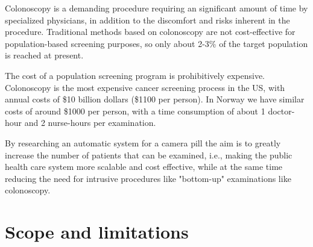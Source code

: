 \documentclass[thesis.tex]{subfiles}
\begin{document}
Colonoscopy is a demanding procedure requiring an significant amount of time by specialized physicians, in addition to the discomfort and risks inherent in the procedure. Traditional methods based on colonoscopy are not cost-effective for population-based screening purposes, so only about 2-3\% of the target population is reached at present. 

The cost of a population screening program is prohibitively expensive. Colonoscopy is the most expensive cancer screening process in the US, with annual costs of \$10 billion dollars (\$1100 per person). In Norway we have similar costs of around \$1000 per person, with a time consumption of about 1 doctor-hour and 2 nurse-hours per examination. 

By researching an automatic system for a camera pill the aim is to greatly increase the number of patients that can be examined, i.e., making the public health care system more scalable and cost effective, while at the same time reducing the need for intrusive procedures like "bottom-up" examinations like colonoscopy.


\section{Scope and limitations} \label{sec:scope_and_limitations}

\end{document}
